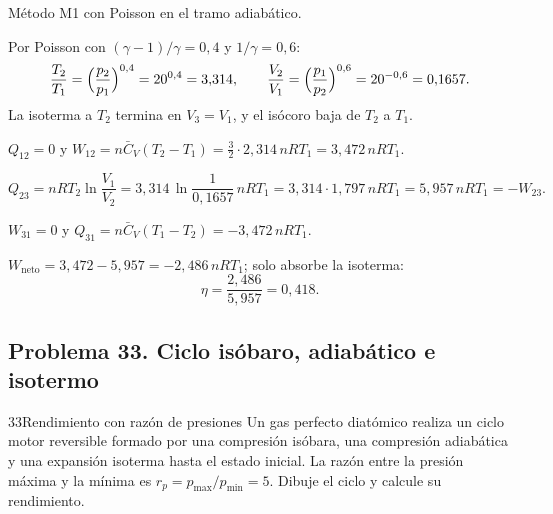 \begin{resolucion}
\idea Método M1 con Poisson en el tramo adiabático.

 Por Poisson con $(\gamma-1)/\gamma=0{,}4$ y $1/\gamma=0{,}6$:
\[
  \frac{T_2}{T_1}=\Bigl(\frac{p_2}{p_1}\Bigr)^{0,4}=20^{0,4}=3{,}314,\qquad
  \frac{V_2}{V_1}=\Bigl(\frac{p_1}{p_2}\Bigr)^{0,6}=20^{-0,6}=0{,}1657 .
\]
La isoterma a $T_2$ termina en $V_3=V_1$, y el isócoro baja de $T_2$ a $T_1$.

 $Q_{12}=0$ y $W_{12}=n\bar C_V(T_2-T_1)=\tfrac32\cdot2{,}314\,nRT_1=3{,}472\,nRT_1$.

\[
  Q_{23}=nRT_2\ln\frac{V_1}{V_2}=3{,}314\,\ln\frac{1}{0{,}1657}\,nRT_1=3{,}314\cdot1{,}797\,nRT_1=5{,}957\,nRT_1=-W_{23}.
\]

 $W_{31}=0$ y $Q_{31}=n\bar C_V(T_1-T_2)=-3{,}472\,nRT_1$.

 $W_{\mathrm{neto}}=3{,}472-5{,}957=-2{,}486\,nRT_1$; solo absorbe la isoterma:
\[
  \eta=\frac{2{,}486}{5{,}957}=\boxed{0{,}418}.
\]
\end{resolucion}



\subsection{Problema 33. Ciclo isóbaro, adiabático e isotermo}
\begin{problema}{33}{Rendimiento con razón de presiones}
Un gas perfecto diatómico realiza un ciclo motor reversible formado por una compresión isóbara, una compresión
adiabática y una expansión isoterma hasta el estado inicial. La razón entre la presión máxima y la mínima es
$r_p=p_{\max}/p_{\min}=5$. Dibuje el ciclo y calcule su rendimiento.
\end{problema}

